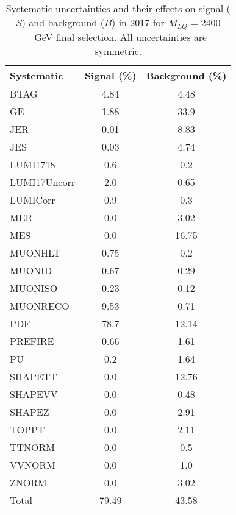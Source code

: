 \begin{table}[htbp]
\begin{center}
\caption{Systematic uncertainties and their effects on signal ($S$) and background ($B$) in 2017 for $M_{LQ}=2400$~GeV final selection. All uncertainties are symmetric.}
\begin{tabular}{lcc}
\hline\hline
Systematic & Signal (\%) & Background (\%) \\ \hline 
BTAG & 4.84 & 4.48\\ 
GE & 1.88 & 33.9\\ 
JER & 0.01 & 8.83\\ 
JES & 0.03 & 4.74\\ 
LUMI1718 & 0.6 & 0.2\\ 
LUMI17Uncorr & 2.0 & 0.65\\ 
LUMICorr & 0.9 & 0.3\\ 
MER & 0.0 & 3.02\\ 
MES & 0.0 & 16.75\\ 
MUONHLT & 0.75 & 0.2\\ 
MUONID & 0.67 & 0.29\\ 
MUONISO & 0.23 & 0.12\\ 
MUONRECO & 9.53 & 0.71\\ 
PDF & 78.7 & 12.14\\ 
PREFIRE & 0.66 & 1.61\\ 
PU & 0.2 & 1.64\\ 
SHAPETT & 0.0 & 12.76\\ 
SHAPEVV & 0.0 & 0.48\\ 
SHAPEZ & 0.0 & 2.91\\ 
TOPPT & 0.0 & 2.11\\ 
TTNORM & 0.0 & 0.5\\ 
VVNORM & 0.0 & 1.0\\ 
ZNORM & 0.0 & 3.02\\ 
Total & 79.49 & 43.58\\ \hline \hline
\end{tabular}
\label{tab:SysUncertainties_uujj_2400}
\end{center}
\end{table}

